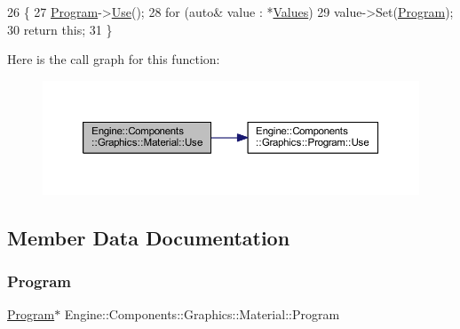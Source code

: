 \begin{DoxyCode}
26 \{
27     \mbox{\hyperlink{classEngine_1_1Components_1_1Graphics_1_1Material_a2a4084db93bb70cd65032baf296803d6}{Program}}->\mbox{\hyperlink{classEngine_1_1Components_1_1Graphics_1_1Program_aed02e665619dda6c6cf80e03cb1f1543}{Use}}();
28     \textcolor{keywordflow}{for} (\textcolor{keyword}{auto}& value : *\mbox{\hyperlink{classEngine_1_1Components_1_1Graphics_1_1Material_a34335608ba1e6eb2c2dba5032107eab0}{Values}})
29         value->Set(\mbox{\hyperlink{classEngine_1_1Components_1_1Graphics_1_1Material_a2a4084db93bb70cd65032baf296803d6}{Program}});
30     \textcolor{keywordflow}{return} \textcolor{keyword}{this};
31 \}
\end{DoxyCode}
Here is the call graph for this function\+:
\nopagebreak
\begin{figure}[H]
\begin{center}
\leavevmode
\includegraphics[width=350pt]{classEngine_1_1Components_1_1Graphics_1_1Material_aef1dd6fbbf0268d4f3e6c371a2f1aa8d_cgraph}
\end{center}
\end{figure}


\subsection{Member Data Documentation}
\mbox{\label{classEngine_1_1Components_1_1Graphics_1_1Material_a2a4084db93bb70cd65032baf296803d6}} 
\subsubsection{\texorpdfstring{Program}{Program}}
{\footnotesize\ttfamily \mbox{\hyperlink{classEngine_1_1Components_1_1Graphics_1_1Program}{Program}}$\ast$ Engine\+::\+Components\+::\+Graphics\+::\+Material\+::\+Program}



